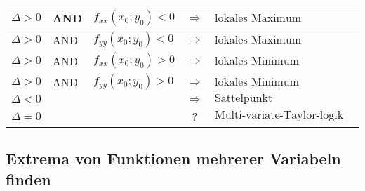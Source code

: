 \begin{enumerate}[itemsep=1ex]
    \begin{tabular}{lllcl}
        \hline
        $\Delta > 0$ &AND& $f_{xx}(x_0;y_0) < 0$ &$\Longrightarrow$& $\text{lokales Maximum}$\\
        \hline
        $\Delta > 0$ &AND& $f_{yy}(x_0;y_0) < 0$ &$\Longrightarrow$& $\text{lokales Maximum}$\\
        \hline
        $\Delta > 0$ &AND& $f_{xx}(x_0;y_0) > 0$ &$\Longrightarrow$& $\text{lokales Minimum}$\\
        \hline
        $\Delta > 0$ &AND& $f_{yy}(x_0;y_0) > 0$ &$\Longrightarrow$& $\text{lokales Minimum}$\\
        \hline
        $\Delta < 0$ &&&$\Longrightarrow$& $\text{Sattelpunkt}$\\
        \hline
        $\Delta = 0$ &&&?& $\text{Multi-variate-Taylor-logik ...}$\\
        \hline
    \end{tabular}

\end{enumerate}

\subsection{Extrema von Funktionen mehrerer Variabeln finden}

